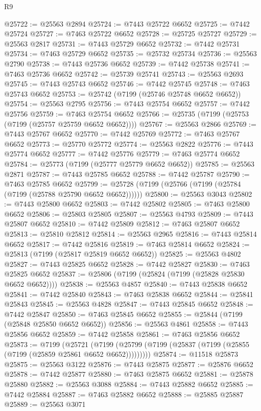 \begin{lexlean}{R9}
\begin{coremodule}
@25722 := @25563 @2894
@25724 := @7443 @25722 @6652
@25725 := @7442 @25724
@25727 := @7463 @25722 @6652
@25728 := @25725 @25727
@25729 := @25563 @2817
@25731 := @7443 @25729 @6652
@25732 := @7442 @25731
@25734 := @7463 @25729 @6652
@25735 := @25732 @25734
@25736 := @25563 @2790
@25738 := @7443 @25736 @6652
@25739 := @7442 @25738
@25741 := @7463 @25736 @6652
@25742 := @25739 @25741
@25743 := @25563 @2693
@25745 := @7443 @25743 @6652
@25746 := @7442 @25745
@25748 := @7463 @25743 @6652
@25753 := @25742 (@7199 (@25746 @25748 @6652 @6652))
@25754 := @25563 @2795
@25756 := @7443 @25754 @6652
@25757 := @7442 @25756
@25759 := @7463 @25754 @6652
@25766 := @25735 (@7199 (@25753 (@7199 (@25757 @25759 @6652 @6652))))
@25767 := @25563 @2866
@25769 := @7443 @25767 @6652
@25770 := @7442 @25769
@25772 := @7463 @25767 @6652
@25773 := @25770 @25772
@25774 := @25563 @2822
@25776 := @7443 @25774 @6652
@25777 := @7442 @25776
@25779 := @7463 @25774 @6652
@25784 := @25773 (@7199 (@25777 @25779 @6652 @6652))
@25785 := @25563 @2871
@25787 := @7443 @25785 @6652
@25788 := @7442 @25787
@25790 := @7463 @25785 @6652
@25799 := @25728 (@7199 (@25766 (@7199 (@25784 (@7199 (@25788 @25790 @6652 @6652))))))
@25800 := @25563 @3043
@25802 := @7443 @25800 @6652
@25803 := @7442 @25802
@25805 := @7463 @25800 @6652
@25806 := @25803 @25805
@25807 := @25563 @4793
@25809 := @7443 @25807 @6652
@25810 := @7442 @25809
@25812 := @7463 @25807 @6652
@25813 := @25810 @25812
@25814 := @25563 @2965
@25816 := @7443 @25814 @6652
@25817 := @7442 @25816
@25819 := @7463 @25814 @6652
@25824 := @25813 (@7199 (@25817 @25819 @6652 @6652))
@25825 := @25563 @4802
@25827 := @7443 @25825 @6652
@25828 := @7442 @25827
@25830 := @7463 @25825 @6652
@25837 := @25806 (@7199 (@25824 (@7199 (@25828 @25830 @6652 @6652))))
@25838 := @25563 @4857
@25840 := @7443 @25838 @6652
@25841 := @7442 @25840
@25843 := @7463 @25838 @6652
@25844 := @25841 @25843
@25845 := @25563 @4828
@25847 := @7443 @25845 @6652
@25848 := @7442 @25847
@25850 := @7463 @25845 @6652
@25855 := @25844 (@7199 (@25848 @25850 @6652 @6652))
@25856 := @25563 @4861
@25858 := @7443 @25856 @6652
@25859 := @7442 @25858
@25861 := @7463 @25856 @6652
@25873 := @7199
    (@25721 (@7199 (@25799 (@7199 (@25837 (@7199 (@25855 (@7199 (@25859 @25861 @6652 @6652)))))))))
@25874 := @11518 @25873
@25875 := @25563 @3122
@25876 := @7443 @25875
@25877 := @25876 @6652
@25878 := @7442 @25877
@25880 := @7463 @25875 @6652
@25881 := @25878 @25880
@25882 := @25563 @3088
@25884 := @7443 @25882 @6652
@25885 := @7442 @25884
@25887 := @7463 @25882 @6652
@25888 := @25885 @25887
@25889 := @25563 @3071

\end{coremodule}
\end{lexlean}
